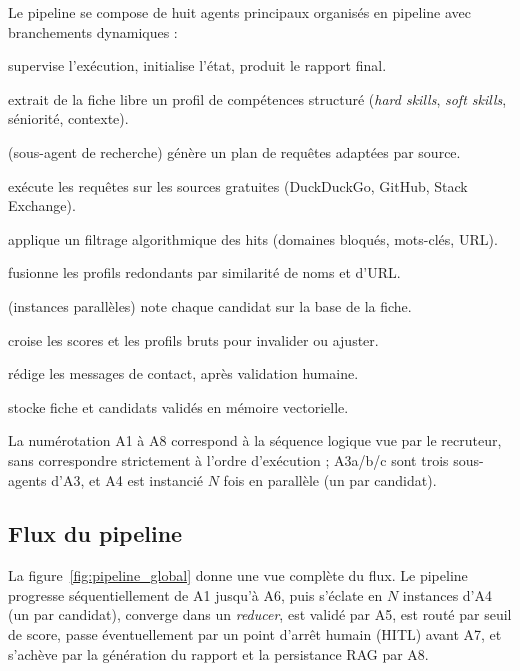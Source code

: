 Le pipeline se compose de huit agents principaux organisés en pipeline avec branchements dynamiques :

\begin{description}[leftmargin=1.4cm,style=nextline]
\item[A1 — Orchestrateur] supervise l'exécution, initialise l'état, produit le rapport final.
\item[A2 — Analyste] extrait de la fiche libre un profil de compétences structuré (\emph{hard skills}, \emph{soft skills}, séniorité, contexte).
\item[A3a — Stratège] (sous-agent de recherche) génère un plan de requêtes adaptées par source.
\item[A3b — Collecteur] exécute les requêtes sur les sources gratuites (DuckDuckGo, GitHub, Stack Exchange).
\item[A3c — Filtre anti-bruit] applique un filtrage algorithmique des hits (domaines bloqués, mots-clés, URL).
\item[A6 — Déduplicateur] fusionne les profils redondants par similarité de noms et d'URL.
\item[A4 — Évaluateur] (instances parallèles) note chaque candidat sur la base de la fiche.
\item[A5 — Vérificateur] croise les scores et les profils bruts pour invalider ou ajuster.
\item[A7 — Recruteur] rédige les messages de contact, après validation humaine.
\item[A8 — Persistance RAG] stocke fiche et candidats validés en mémoire vectorielle.
\end{description}

La numérotation A1 à A8 correspond à la séquence logique vue par le recruteur, sans correspondre strictement à l'ordre d'exécution ; A3a/b/c sont trois sous-agents d'A3, et A4 est instancié $N$ fois en parallèle (un par candidat).

\subsection{Flux du pipeline}

La figure~\ref{fig:pipeline_global} donne une vue complète du flux. Le pipeline progresse séquentiellement de A1 jusqu'à A6, puis s'éclate en $N$ instances d'A4 (un par candidat), converge dans un \emph{reducer}, est validé par A5, est routé par seuil de score, passe éventuellement par un point d'arrêt humain (HITL) avant A7, et s'achève par la génération du rapport et la persistance RAG par A8.

